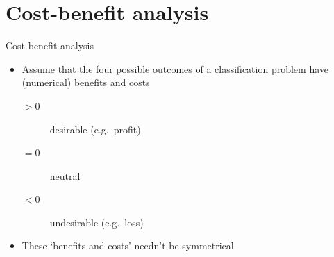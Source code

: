 \section{Cost\hyp{}benefit analysis}

\begin{frame}{Cost\hyp{}benefit analysis}
    \begin{itemize}
        \item Assume that the four possible outcomes of a classification problem
              have (numerical) \alert{benefits and costs}
              \begin{description}
                  \item[$> 0$] desirable (e.g.\ profit)
                  \item[$= 0$] neutral
                  \item[$< 0$] undesirable (e.g.\ loss) \\[\bigskipamount]
              \end{description}
        \item These `benefits and costs' needn't be symmetrical
    \end{itemize}
\end{frame}

\newsavebox{\TPexA}

\newsavebox{\TNexA}

\newsavebox{\FPexA}

\newsavebox{\FNexA}

